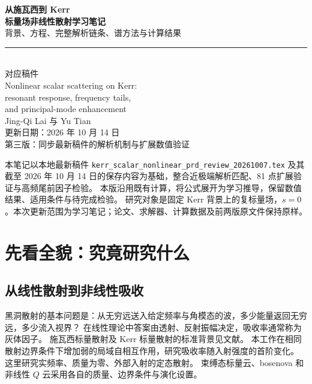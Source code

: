 \documentclass[UTF8,fontset=fandol,11pt,a4paper]{ctexart}
\numberwithin{equation}{section}
\begin{document}
\begin{titlepage}
\vspace*{16mm}
\begin{center}
{\Huge\bfseries 从施瓦西到 Kerr}\\[7mm]
{\LARGE\bfseries 标量场非线性散射学习笔记}\\[7mm]
{\large 背景、方程、完整解析链条、谱方法与计算结果}\\[15mm]
\rule{.86\textwidth}{.6pt}\\[7mm]
{\large 对应稿件}\\[3mm]
{\large Nonlinear scalar scattering on Kerr:\\resonant response, frequency tails,\\and principal-mode enhancement}\\[5mm]
{\large Jing-Qi Lai 与 Yu Tian}\\[12mm]
更新日期：2026 年 10 月 14 日\\[3mm]
第三版：同步最新稿件的解析机制与扩展数值验证
\end{center}
\vfill
\begin{remarkbox}
本笔记以本地最新稿件 \texttt{kerr\_scalar\_nonlinear\_prd\_review\_20261007.tex}
及其截至 2026 年 10 月 14 日的保存内容为基础，整合近极端解析匹配、81 点扩展验证与高频尾前因子检验。
本版沿用既有计算，将公式展开为学习推导，保留数值结果、适用条件与待完成检验。
研究对象是固定 Kerr 背景上的复标量场，$s=0$。本次更新范围为学习笔记；论文、求解器、计算数据及前两版原文件保持原样。
\end{remarkbox}
\end{titlepage}
\tableofcontents\clearpage

\section{先看全貌：究竟研究什么}
\subsection{从线性散射到非线性吸收}
黑洞散射的基本问题是：从无穷远送入给定频率与角模态的波，多少能量返回无穷远，多少流入视界？
在线性理论中答案由透射、反射振幅决定，吸收率通常称为灰体因子。
施瓦西标量散射及 Kerr 标量散射的标准背景见文献\cite{Sanchez1976,Futterman,GlampedakisAndersson2001}。
本工作在相同散射边界条件下增加弱的局域自相互作用，研究吸收率随入射强度的首阶变化。
这里研究实频率、质量为零、外部入射的定态散射。
束缚态标量云、bosenova 和非线性 $Q$ 云\cite{YoshinoKodama2012,Baryakhtar2021,HerdeiroQCloud2014}采用各自的质量、边界条件与演化设置。
\end{document}
